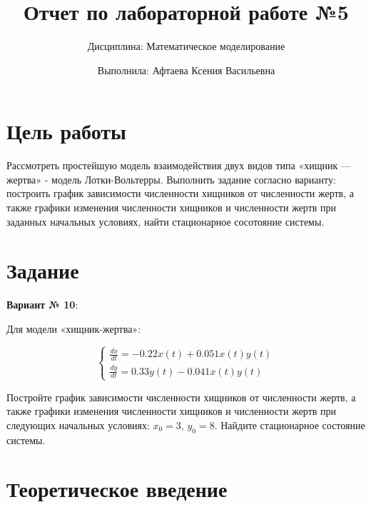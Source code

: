 \documentclass[
  12pt,
  a4paper,
]{scrreprt}
\title{Отчет по лабораторной работе №5}
\subtitle{Дисциплина: Математическое моделирование}
\author{Выполнила: Афтаева Ксения Васильевна}
\date{}
\begin{document}
\maketitle

\renewcommand*\contentsname{Содержание}
{
\setcounter{tocdepth}{2}
\tableofcontents
}
\listoffigures
\listoftables
{}
\hypertarget{ux446ux435ux43bux44c-ux440ux430ux431ux43eux442ux44b}{%
\chapter{Цель
работы}\label{ux446ux435ux43bux44c-ux440ux430ux431ux43eux442ux44b}}

Рассмотреть простейшую модель взаимодействия двух видов типа «хищник —
жертва» - модель Лотки-Вольтерры. Выполнить задание согласно варианту:
построить график зависимости численности хищников от численности жертв,
а также графики изменения численности хищников и численности жертв при
заданных начальных условиях, найти стационарное сосотояние системы.

\hypertarget{ux437ux430ux434ux430ux43dux438ux435}{%
\chapter{Задание}\label{ux437ux430ux434ux430ux43dux438ux435}}

\textbf{Вариант № 10}:

Для модели «хищник-жертва»:

\begin{equation}
   \begin{cases}
     \frac{dx}{dt} = -0.22x(t)+0.051x(t)y(t)
     \\
     \frac{dy}{dt} = 0.33y(t)-0.041x(t)y(t)
   \end{cases}
\label{eq:01}\end{equation}

Постройте график зависимости численности хищников от численности жертв,
а также графики изменения численности хищников и численности жертв при
следующих начальных условиях: \(x_0 = 3\), \(y_0 = 8\). Найдите
стационарное состояние системы.

\hypertarget{ux442ux435ux43eux440ux435ux442ux438ux447ux435ux441ux43aux43eux435-ux432ux432ux435ux434ux435ux43dux438ux435}{%
\chapter{Теоретическое
введение}\label{ux442ux435ux43eux440ux435ux442ux438ux447ux435ux441ux43aux43eux435-ux432ux432ux435ux434ux435ux43dux438ux435}}
\end{document}
